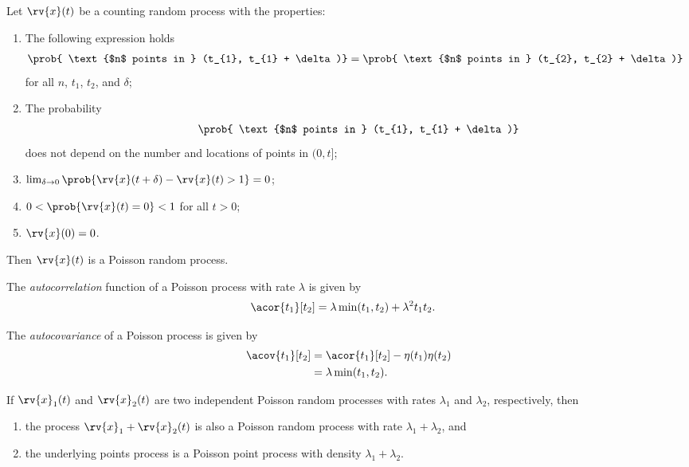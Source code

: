 \begin{theoremBox}
     Let $\rv{x}(t)$ be a counting random process with the properties:
     \begin{enumerate}
         \item The following expression holds
         \begin{align}
             \prob{ \text{$n$ points in } (t_{1}, t_{1} + \delta)}&=
             \prob{ \text{$n$ points in } (t_{2}, t_{2} + \delta)}
         \end{align}
         for all $n$, $t_{1}$, $t_{2}$, and $\delta$;
         \item The probability
         \begin{align}
            \prob{ \text{$n$ points in } (t_{1}, t_{1} + \delta)}
         \end{align}
         does not depend on the number and locations of points in $(0, t]$;

         \item $\lim_{\delta \to 0}\prob{\rv{x}(t+\delta) - \rv{x}(t) > 1}=0$;
         \item $0<\prob{\rv{x}(t)=0}<1$ for all $t>0$;
         \item $\rv{x}(0)=0$.
     \end{enumerate}
     Then $\rv{x}(t)$ is a Poisson random process.
\end{theoremBox}

\begin{theoremBox}
     The \emph{autocorrelation} function of a Poisson process with rate $\lambda$ is given by
     \begin{align}
         \acor{t_{1}}[t_{2}] &= \lambda \min(t_{1}, t_{2}) + \lambda^{2}t_{1}t_{2}.
     \end{align}
\end{theoremBox}

\begin{theoremBox}
     The \emph{autocovariance} of a Poisson process is given by
     \begin{align}
         \acov{t_{1}}[t_{2}] &= \acor{t_{1}}[t_{2}] - \eta(t_{1})\eta(t_{2})\\
         &= \lambda\min(t_{1}, t_{2}).
     \end{align}
\end{theoremBox}

\begin{theoremBox}
    If $\rv{x}_{1}(t)$ and $\rv{x}_{2}(t)$ are two independent Poisson random processes with rates $\lambda_{1}$ and $\lambda_{2}$, respectively, then
    \begin{enumerate}
        \item the process $\rv{x}_{1} + \rv{x}_{2}(t)$ is also a Poisson random process with rate $\lambda_{1} + \lambda_{2}$, and
        \item the underlying points process is a Poisson point process with density $\lambda_{1} + \lambda_{2}$.
    \end{enumerate}
\end{theoremBox}

